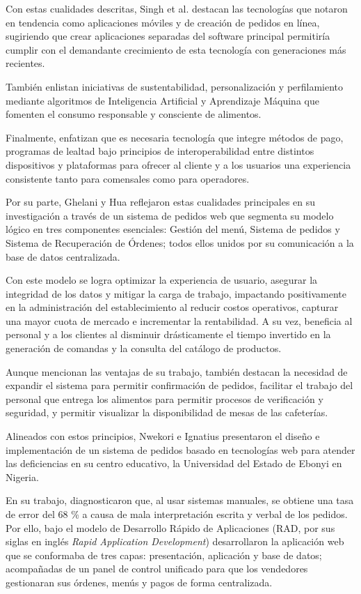 Con estas cualidades descritas, Singh et al. destacan las tecnologías que notaron en tendencia como aplicaciones móviles y de creación de pedidos en línea, sugiriendo que crear aplicaciones separadas del software principal permitiría cumplir con el demandante crecimiento de esta tecnología con generaciones más recientes. 

También enlistan iniciativas de sustentabilidad, personalización y perfilamiento mediante algoritmos de Inteligencia Artificial y Aprendizaje Máquina que fomenten el consumo responsable y consciente de alimentos. 

Finalmente, enfatizan que es necesaria tecnología que integre métodos de pago, programas de lealtad bajo principios de interoperabilidad entre distintos dispositivos y plataformas para ofrecer al cliente y a los usuarios una experiencia consistente tanto para comensales como para operadores. 

Por su parte, Ghelani y Hua \cite{ghelani2022perspective} reflejaron estas cualidades principales en su investigación a través de un sistema de pedidos web que segmenta su modelo lógico en tres componentes esenciales: Gestión del menú, Sistema de pedidos y Sistema de Recuperación de Órdenes; todos ellos unidos por su comunicación a la base de datos centralizada.  

Con este modelo se logra optimizar la experiencia de usuario, asegurar la integridad de los datos y mitigar la carga de trabajo, impactando positivamente en la administración del establecimiento al reducir costos operativos, capturar una mayor cuota de mercado e incrementar la rentabilidad. A su vez, beneficia al personal y a los clientes al disminuir drásticamente el tiempo invertido en la generación de comandas y la consulta del catálogo de productos. 

Aunque mencionan las ventajas de su trabajo, también destacan la necesidad de expandir el sistema para permitir confirmación de pedidos, facilitar el trabajo del personal que entrega los alimentos para permitir procesos de verificación y seguridad, y permitir visualizar la disponibilidad de mesas de las cafeterías. 

Alineados con estos principios, Nwekori e Ignatius \cite{nwekori2025design} presentaron el diseño e implementación de un sistema de pedidos basado en tecnologías web para atender las deficiencias en su centro educativo, la Universidad del Estado de Ebonyi en Nigeria. 

En su trabajo, diagnosticaron que, al usar sistemas manuales, se obtiene una tasa de error del 68 \% a causa de mala interpretación escrita y verbal de los pedidos. Por ello, bajo el modelo de Desarrollo Rápido de Aplicaciones (RAD, por sus siglas en inglés \textit{Rapid Application Development}) desarrollaron la aplicación web que se conformaba de tres capas: presentación, aplicación y base de datos; acompañadas de un panel de control unificado para que los vendedores gestionaran sus órdenes, menús y pagos de forma centralizada.

